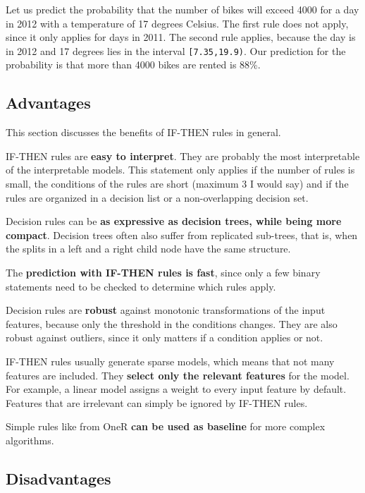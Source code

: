 \documentclass[
  11pt,
]{scrbook}
\begin{document}
Let us predict the probability that the number of bikes will exceed 4000 for a day in 2012 with a temperature of 17 degrees Celsius.
The first rule does not apply, since it only applies for days in 2011.
The second rule applies, because the day is in 2012 and 17 degrees lies in the interval \texttt{{[}7.35,19.9)}.
Our prediction for the probability is that more than 4000 bikes are rented is 88\%.

\hypertarget{advantages-3}{%
\subsection{Advantages}\label{advantages-3}}

This section discusses the benefits of IF-THEN rules in general.

IF-THEN rules are \textbf{easy to interpret}.
They are probably the most interpretable of the interpretable models.
This statement only applies if the number of rules is small, the conditions of the rules are short (maximum 3 I would say) and if the rules are organized in a decision list or a non-overlapping decision set.

Decision rules can be \textbf{as expressive as decision trees, while being more compact}.
Decision trees often also suffer from replicated sub-trees, that is, when the splits in a left and a right child node have the same structure.

The \textbf{prediction with IF-THEN rules is fast}, since only a few binary statements need to be checked to determine which rules apply.

Decision rules are \textbf{robust} against monotonic transformations of the input features, because only the threshold in the conditions changes.
They are also robust against outliers, since it only matters if a condition applies or not.

IF-THEN rules usually generate sparse models, which means that not many features are included.
They \textbf{select only the relevant features} for the model.
For example, a linear model assigns a weight to every input feature by default.
Features that are irrelevant can simply be ignored by IF-THEN rules.

Simple rules like from OneR \textbf{can be used as baseline} for more complex algorithms.

\hypertarget{disadvantages-3}{%
\subsection{Disadvantages}\label{disadvantages-3}}
\end{document}
